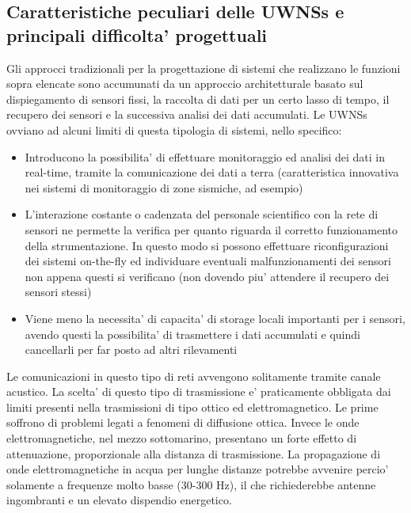 \subsection{Caratteristiche peculiari delle UWNSs e principali difficolta' progettuali}
Gli approcci tradizionali per la progettazione di sistemi che realizzano le funzioni sopra elencate sono accumunati da un approccio architetturale basato sul dispiegamento di sensori fissi, la raccolta di dati per un certo lasso di tempo, il recupero dei sensori e la successiva analisi dei dati accumulati.\newline
Le UWNSs ovviano ad alcuni limiti di questa tipologia di sistemi, nello specifico: \newline
\begin{itemize}
\item Introducono la possibilita' di effettuare monitoraggio ed analisi dei dati in real-time, tramite la comunicazione dei dati a terra (caratteristica innovativa nei sistemi di monitoraggio di zone sismiche, ad esempio)\newline
\item L'interazione costante o cadenzata del personale scientifico con la rete di sensori ne permette la verifica per quanto riguarda il corretto funzionamento della strumentazione. \newline In questo modo si possono effettuare riconfigurazioni dei sistemi on-the-fly ed individuare eventuali malfunzionamenti dei sensori non appena questi si verificano (non dovendo piu' attendere il recupero dei sensori stessi)\newline
\item Viene meno la necessita' di capacita' di storage locali importanti per i sensori, avendo questi la possibilita' di trasmettere i dati accumulati e quindi cancellarli per far posto ad altri rilevamenti
\end{itemize}
Le comunicazioni in questo tipo di reti avvengono solitamente tramite canale acustico. La scelta' di questo tipo di trasmissione e' praticamente obbligata dai limiti presenti nella trasmissioni di tipo ottico ed elettromagnetico. Le prime soffrono di problemi legati a fenomeni di diffusione ottica.  Invece le onde elettromagnetiche, nel mezzo sottomarino, presentano un forte effetto di attenuazione, proporzionale alla distanza di trasmissione. La propagazione di onde elettromagnetiche in acqua per lunghe distanze potrebbe avvenire percio' solamente a frequenze molto basse (30-300 Hz), il che richiederebbe antenne ingombranti e un elevato dispendio energetico.

